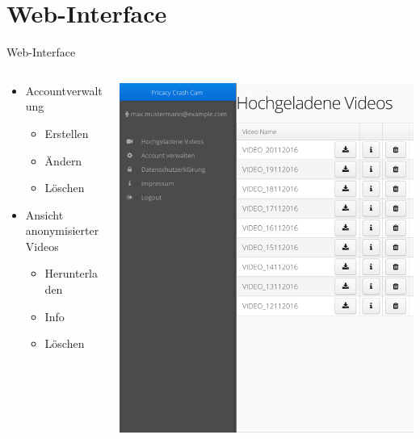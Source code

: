 \documentclass[19pt]{beamer}
\begin{document}
\section{Web-Interface}
\begin{frame}{Web-Interface}
  \begin{columns}[T]
    \begin{column}{.5\textwidth}
    		\begin{itemize}
    			\item Accountverwaltung
    				\begin{itemize}
					\item Erstellen
					\item \"Andern
					\item L\"oschen
				\end{itemize}
			\pause
			\item Ansicht anonymisierter Videos
    				\begin{itemize}
					\item Herunterladen
					\item Info
					\item L\"oschen
				\end{itemize}
    		\end{itemize}
    \end{column}
    \begin{column}{.5\textwidth}
    		\includegraphics[scale=0.5]{../subtopicsFuncspec/Res/Mockups/Webinterface_small_pres}
    \end{column}
  \end{columns}
\end{frame}
\end{document}
